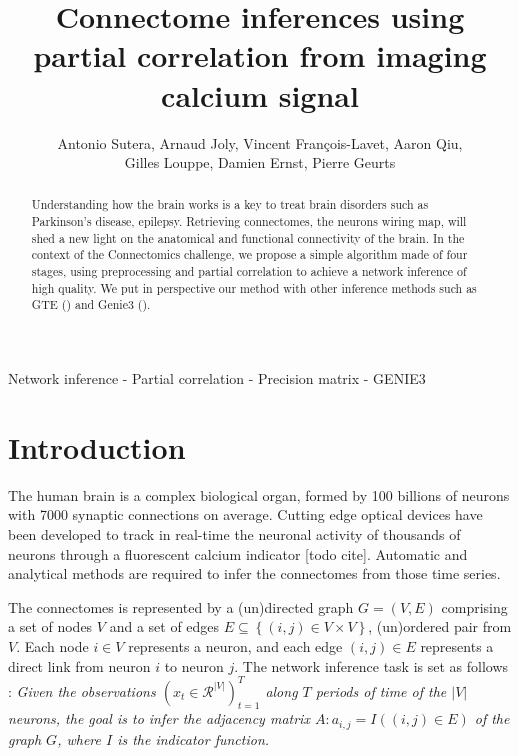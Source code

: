 \documentclass[wcp]{jmlr}
\title{Connectome inferences using partial correlation from imaging calcium signal}
\author{Antonio Sutera,
        Arnaud Joly,
        Vincent François-Lavet,
        Aaron Qiu, \\
        Gilles Louppe,
        Damien Ernst,
        Pierre Geurts}
\begin{document}
\maketitle


\begin{abstract}
Understanding how the brain works is a key
to treat brain disorders such as Parkinson's disease,
epilepsy. Retrieving connectomes, the neurons wiring map, will shed a new
light on the anatomical and functional connectivity of the brain. In the
context of the Connectomics challenge, we propose a simple  algorithm made of
four stages, using preprocessing and partial correlation to achieve a network
inference of high quality. We put in perspective our method
with other inference methods such as GTE (\cite{stetter2012model}) and Genie3
(\cite{huynhthu2010inferring}).


\end{abstract}

\begin{keywords}
Network inference - Partial correlation - Precision matrix - GENIE3
\end{keywords}


\section{Introduction}\label{sec:intro}

The human brain is a complex biological organ, formed by 100
billions of neurons with 7000 synaptic connections on average.
Cutting edge optical devices have been developed to track in real-time
the neuronal activity of thousands of neurons through a fluorescent
calcium indicator  [todo cite]. Automatic and analytical methods are required to infer
the connectomes from those time series.

The connectomes is represented by a (un)directed graph $G = (V, E)$ comprising
a set of nodes $V$ and a set of edges $E \subseteq \left\{(i, j) \in V \times
V\right\}$, (un)ordered pair from $V$.
Each node $i \in V$ represents a neuron, and each edge $(i, j) \in E$
represents a direct link from neuron $i$ to neuron $j$.
The network inference task is set as follows :
\textit{Given the observations $(x_t \in \mathcal{R}^{|V|})_{t=1}^T $
along $T$ periods of time of the $|V|$ neurons, the goal is to infer the
adjacency matrix $A : a_{i,j} = I((i, j) \in E)$ of the graph $G$,
where $I$ is the indicator function.}
\end{document}
